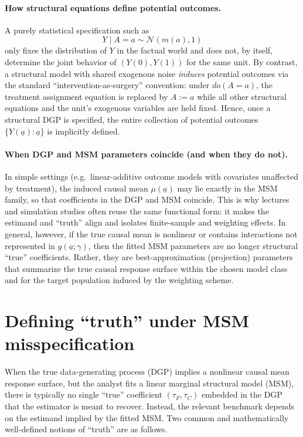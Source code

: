 \paragraph{How structural equations define potential outcomes.}
A purely statistical specification such as
\[
Y \mid A=a \sim \mathcal N(m(a),1)
\]
only fixes the distribution of $Y$ in the factual world and does not, by itself, determine the joint behavior of $(Y(0),Y(1))$ for the same unit. By contrast, a structural model with shared exogenous noise \emph{induces} potential outcomes via the standard ``intervention-as-surgery'' convention: under $do(A=a)$, the treatment assignment equation is replaced by $A:=a$ while all other structural equations and the unit's exogenous variables are held fixed. Hence, once a structural DGP is specified, the entire collection of potential outcomes $\{Y(\underline a): \underline a\}$ is implicitly defined.

\paragraph{When DGP and MSM parameters coincide (and when they do not).}
In simple settings (e.g.\ linear-additive outcome models with covariates unaffected by treatment), the induced causal mean $\mu(\underline a)$ may lie exactly in the MSM family, so that coefficients in the DGP and MSM coincide. This is why lectures and simulation studies often reuse the same functional form: it makes the estimand and ``truth'' align and isolates finite-sample and weighting effects. In general, however, if the true causal mean is nonlinear or contains interactions not represented in $g(\underline a;\gamma)$, then the fitted MSM parameters are no longer structural ``true'' coefficients. Rather, they are best-approximation (projection) parameters that summarize the true causal response surface within the chosen model class and for the target population induced by the weighting scheme.

\section{Defining ``truth'' under MSM misspecification}
\label{sec:truth_under_misspec}
When the true data-generating process (DGP) implies a nonlinear causal mean 
response surface, but the analyst fits a linear marginal structural model (MSM), 
there is typically no single ``true'' coefficient $(\tau_F,\tau_C)$ 
embedded in the DGP that the estimator is meant to recover. 
Instead, the relevant benchmark depends on the estimand implied 
by the fitted MSM. Two common and mathematically well-defined notions 
of ``truth'' are as follows.


